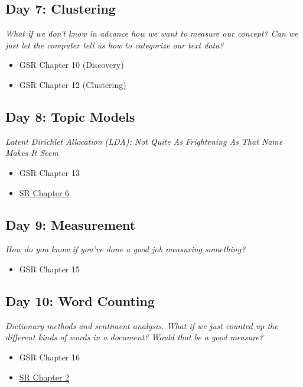 \documentclass[11pt, letterpaper]{article}
\begin{document}
\subsection*{Day 7: Clustering}

\textit{What if we don't know in advance how we want to measure our concept? Can we just let the computer tell us how to categorize our text data?}

\begin{itemize}
	\item GSR Chapter 10 (Discovery)
	\item GSR Chapter 12 (Clustering)
\end{itemize}



\subsection*{Day 8: Topic Models}

\textit{Latent Dirichlet Allocation (LDA): Not Quite As Frightening As That Name Makes It Seem}

\begin{itemize}
	\item GSR Chapter 13
	\item \href{https://www.tidytextmining.com/topicmodeling.html}{SR Chapter 6}
\end{itemize}

\subsection*{Day 9: Measurement}

\textit{How do you know if you've done a good job measuring something?}

\begin{itemize}
	\item GSR Chapter 15
\end{itemize}


\subsection*{Day 10: Word Counting}

\textit{Dictionary methods and sentiment analysis. What if we just counted up the different kinds of words in a document? Would that be a good measure?}

\begin{itemize}
	\item GSR Chapter 16
	\item \href{https://www.tidytextmining.com/sentiment.html}{SR Chapter 2}
\end{itemize}
\end{document}
